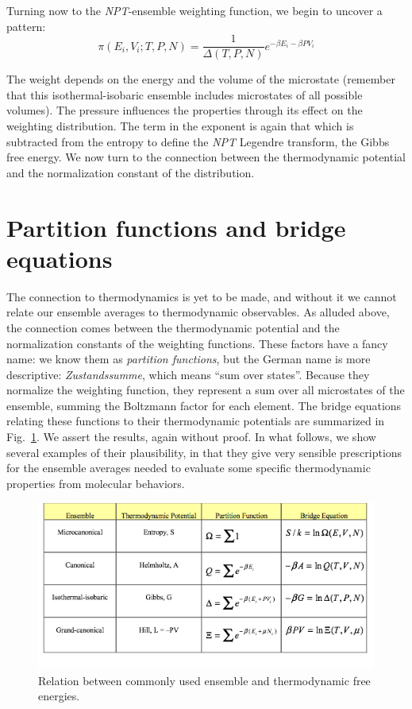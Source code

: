 \documentclass[9pt,bestpractices]{molsim}
\begin{document}
Turning now to the \emph{NPT}-ensemble weighting function, we begin to uncover
a pattern:
\[\pi ({E_i},{V_i};T,P,N) = \frac{1}{{\Delta (T,P,N)}}{e^{ - \beta {E_i} - \beta P{V_i}}}\]

The weight depends on the energy and the volume of the microstate
(remember that this isothermal-isobaric ensemble includes microstates of
all possible volumes). The pressure influences the properties through
its effect on the weighting distribution. The term in the exponent is
again that which is subtracted from the entropy to define the \emph{NPT}
Legendre transform, the Gibbs free energy. We now turn to the connection
between the thermodynamic potential and the normalization constant of
the distribution.

\section{Partition functions and bridge
equations}\label{partition-functions-and-bridge-equations}

The connection to thermodynamics is yet to be made, and without it we
cannot relate our ensemble averages to thermodynamic observables. As
alluded above, the connection comes between the thermodynamic potential
and the normalization constants of the weighting functions. These
factors have a fancy name: we know them as \emph{partition functions},
but the German name is more descriptive: \emph{Zustandssumme}, which means
``sum over states''. Because they normalize the weighting function, they
represent a sum over all microstates of the ensemble, summing the
Boltzmann factor for each element. The bridge equations relating these
functions to their thermodynamic potentials are summarized in
Fig.~\ref{fig:bridgeEqns}. We assert the results, again without proof. In what follows, we
show several examples of their plausibility, in that they give very
sensible prescriptions for the ensemble averages needed to evaluate some
specific thermodynamic properties from molecular behaviors.

\begin{figure}
\includegraphics[width=\textwidth]{StatMech_figures/image011}
\caption{\label{fig:bridgeEqns}Relation between commonly used ensemble and thermodynamic free energies.}
\end{figure}
\end{document}
